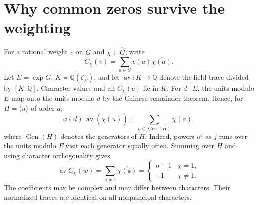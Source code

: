 \documentclass[11pt]{article}
\newcommand{\av}{\operatorname{av}}
\newcommand{\gen}{\operatorname{Gen}}
\newcommand{\one}{\mathbf{1}}
\begin{document}
\section{Why common zeros survive the weighting}
For a rational weight $v$ on $G$ and $\chi\in\widehat G$, write
\[
 C_\chi(v)=\sum_{a\in G}v(a)\overline{\chi(a)}.
\]
Let $E=\exp G$, $K=\mathbb Q(\zeta_E)$, and let $\av:K\to\mathbb Q$ denote the field trace divided by $[K:\mathbb Q]$. Character values and all $C_\chi(v)$ lie in $K$. For $d\mid E$, the units modulo $E$ map onto the units modulo $d$ by the Chinese remainder theorem. Hence, for $H=\langle u\rangle$ of order $d$,
\[
 \varphi(d)\,\av(\overline{\chi(u)})=
 \sum_{a\in\gen(H)}\overline{\chi(a)},
\]
where $\gen(H)$ denotes the generators of $H$. Indeed, powers $u^j$ as $j$ runs over the units modulo $E$ visit each generator equally often. Summing over $H$ and using character orthogonality gives
\begin{equation}\label{trace}
 \av C_\chi(w)=\sum_{a\ne e}\overline{\chi(a)}
 =\begin{cases}n-1&\chi=\one,\\-1&\chi\ne\one.\end{cases}
\end{equation}
The coefficients may be complex and may differ between characters. Their normalized traces are identical on all nonprincipal characters.
\end{document}
